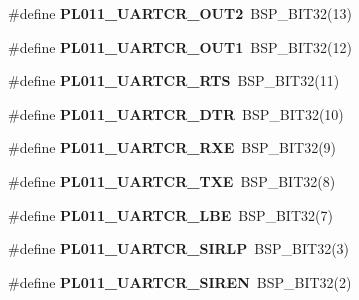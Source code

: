 \begin{DoxyCompactItemize}
\item 
\mbox{\label{arm-pl011-regs_8h_a890fcf9123f6f55a67f1705b44a724a3}} 
\#define {\bfseries P\+L011\+\_\+\+U\+A\+R\+T\+C\+R\+\_\+\+O\+U\+T2}~B\+S\+P\+\_\+\+B\+I\+T32(13)
\item 
\mbox{\label{arm-pl011-regs_8h_ae67abf7752fcd4b895729e87270c1be5}} 
\#define {\bfseries P\+L011\+\_\+\+U\+A\+R\+T\+C\+R\+\_\+\+O\+U\+T1}~B\+S\+P\+\_\+\+B\+I\+T32(12)
\item 
\mbox{\label{arm-pl011-regs_8h_af822537297a3f9070571c047dcb38b82}} 
\#define {\bfseries P\+L011\+\_\+\+U\+A\+R\+T\+C\+R\+\_\+\+R\+TS}~B\+S\+P\+\_\+\+B\+I\+T32(11)
\item 
\mbox{\label{arm-pl011-regs_8h_a0b107451606077b84a410708acc2c141}} 
\#define {\bfseries P\+L011\+\_\+\+U\+A\+R\+T\+C\+R\+\_\+\+D\+TR}~B\+S\+P\+\_\+\+B\+I\+T32(10)
\item 
\mbox{\label{arm-pl011-regs_8h_a01464d9183725968befd69daaab524e7}} 
\#define {\bfseries P\+L011\+\_\+\+U\+A\+R\+T\+C\+R\+\_\+\+R\+XE}~B\+S\+P\+\_\+\+B\+I\+T32(9)
\item 
\mbox{\label{arm-pl011-regs_8h_a1b5610c7bd702cda31e33e6e11b4ef7d}} 
\#define {\bfseries P\+L011\+\_\+\+U\+A\+R\+T\+C\+R\+\_\+\+T\+XE}~B\+S\+P\+\_\+\+B\+I\+T32(8)
\item 
\mbox{\label{arm-pl011-regs_8h_ad33f76059c2a4097a45890651a508a27}} 
\#define {\bfseries P\+L011\+\_\+\+U\+A\+R\+T\+C\+R\+\_\+\+L\+BE}~B\+S\+P\+\_\+\+B\+I\+T32(7)
\item 
\mbox{\label{arm-pl011-regs_8h_a4b1bc3a0b08dfb69a4cb9879e2aa7dd4}} 
\#define {\bfseries P\+L011\+\_\+\+U\+A\+R\+T\+C\+R\+\_\+\+S\+I\+R\+LP}~B\+S\+P\+\_\+\+B\+I\+T32(3)
\item 
\mbox{\label{arm-pl011-regs_8h_ac97dd9ea000a10d88940eaabff4205dd}} 
\#define {\bfseries P\+L011\+\_\+\+U\+A\+R\+T\+C\+R\+\_\+\+S\+I\+R\+EN}~B\+S\+P\+\_\+\+B\+I\+T32(2)
\item 
\mbox{\label{arm-pl011-regs_8h_a5b88299dec7217e9619cffd075d8bdf8}} 

\end{DoxyCompactItemize}
